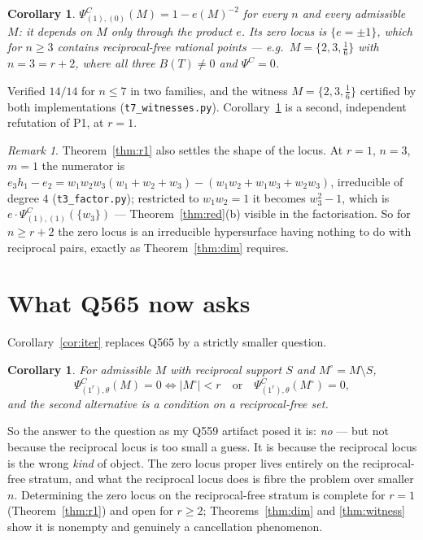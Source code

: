 \documentclass[11pt]{article}
\newtheorem{corollary}[theorem]{Corollary}
\theoremstyle{definition}
\theoremstyle{remark}
\newtheorem{remark}[theorem]{Remark}
\newcommand{\PsiC}{\Psi^{C}}
\begin{document}
\begin{corollary}\label{cor:prod}
$\PsiC_{(1),(0)}(M)=1-e(M)^{-2}$ for every $n$ and every admissible $M$: it
depends on $M$ only through the product $e$. Its zero locus is $\{e=\pm1\}$, which
for $n\ge3$ contains reciprocal-free rational points --- e.g.\ $M=\{2,3,\tfrac16\}$
with $n=3=r+2$, where all three $B(T)\ne0$ and $\PsiC=0$.
\end{corollary}

Verified $14/14$ for $n\le7$ in two families, and the witness
$M=\{2,3,\frac16\}$ certified by both implementations
(\texttt{t7\_witnesses.py}). Corollary~\ref{cor:prod} is a second,
independent refutation of P1, at $r=1$.

\begin{remark}
Theorem~\ref{thm:r1} also settles the shape of the locus. At $r=1$, $n=3$,
$m=1$ the numerator is $e_3h_1-e_2=
w_1w_2w_3(w_1+w_2+w_3)-(w_1w_2+w_1w_3+w_2w_3)$, irreducible of degree $4$
(\texttt{t3\_factor.py}); restricted to $w_1w_2=1$ it becomes $w_3^2-1$, which is
$e\cdot\PsiC_{(1),(1)}(\{w_3\})$ --- Theorem~\ref{thm:red}(b) visible in the
factorisation. So for $n\ge r+2$ the zero locus is an irreducible hypersurface
having nothing to do with reciprocal pairs, exactly as Theorem~\ref{thm:dim}
requires.
\end{remark}

\section{What Q565 now asks}

Corollary~\ref{cor:iter} replaces Q565 by a strictly smaller question.

\begin{corollary}\label{cor:reduce}
For admissible $M$ with reciprocal support $S$ and $M^\circ=M\setminus S$,
\[
  \PsiC_{(1^r),\theta}(M)=0
  \iff
  |M^\circ|<r \quad\text{or}\quad \PsiC_{(1^r),\theta}(M^\circ)=0,
\]
and the second alternative is a condition on a \emph{reciprocal-free} set.
\end{corollary}

So the answer to the question as my Q559 artifact posed it is: \emph{no} --- but
not because the reciprocal locus is too small a guess. It is because the
reciprocal locus is the wrong \emph{kind} of object. The zero locus proper lives
entirely on the reciprocal-free stratum, and what the reciprocal locus does is
fibre the problem over smaller $n$. Determining the zero locus on the
reciprocal-free stratum is complete for $r=1$ (Theorem~\ref{thm:r1}) and open for
$r\ge2$; Theorems~\ref{thm:dim} and \ref{thm:witness} show it is nonempty and
genuinely a cancellation phenomenon.
\end{document}
